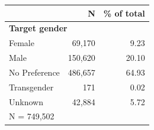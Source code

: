 \begin{tabular}{lrr}


\toprule


 & N & \% of total \\


\midrule


\multicolumn{3}{l}{\textbf{Target gender}}\\ 
\midrule
Female              &      69,170&        9.23\\
Male                &     150,620&       20.10\\
No Preference       &     486,657&       64.93\\
Transgender         &         171&        0.02\\
Unknown             &      42,884&        5.72\\
\midrule


\multicolumn{3}{l}{\footnotesize N =      749,502}\\


\bottomrule


\end{tabular}


